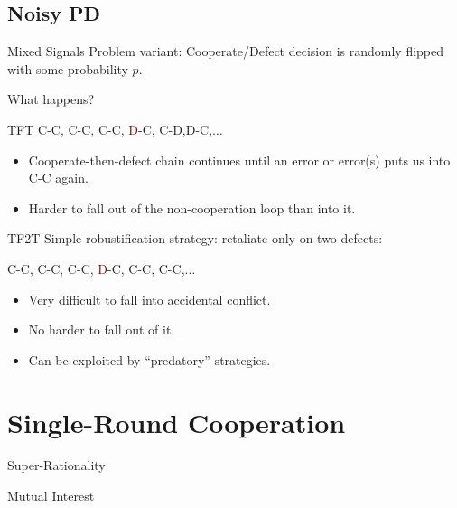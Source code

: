 \documentclass[pdf]{beamer}
\begin{document}
\subsection{Noisy PD}
\begin{frame}{Mixed Signals}
  Problem variant: Cooperate/Defect decision is randomly flipped with some probability $p$.\newline

  What happens?
\end{frame}
\begin{frame}{TFT}
  C-C\pause, C-C\pause, C-C\pause, \textcolor{darkred}{D}-C\pause, C-D\pause,D-C\pause,$\ldots$\pause

  \begin{itemize}
  \item Cooperate-then-defect chain continues until an error or error(s) puts us into C-C again.
    \pause
  \item Harder to fall out of the non-cooperation loop than into it.
  \end{itemize}
\end{frame}

\begin{frame}{TF2T}
  Simple robustification strategy: retaliate only on two defects:\pause
  
  C-C\pause, C-C\pause, C-C\pause, \textcolor{darkred}{D}-C\pause, C-C\pause, C-C\pause,$\ldots$

  \begin{itemize}
  \item Very difficult to fall into accidental conflict.
    \pause
  \item No harder to fall out of it.
    \pause
  \item Can be exploited by ``predatory'' strategies.
  \end{itemize}
  
\end{frame}

\section{Single-Round Cooperation}
\begin{frame}{Super-Rationality}
\end{frame}

\begin{frame}{Mutual Interest}
\end{frame}
\end{document}

